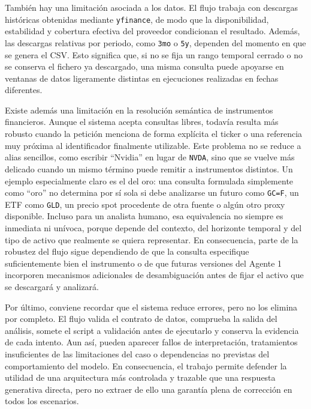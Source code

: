 Tambi\'en hay una limitaci\'on asociada a los datos. El flujo trabaja con descargas hist\'oricas obtenidas mediante \texttt{yfinance}, de modo que la disponibilidad, estabilidad
y cobertura efectiva del proveedor condicionan el resultado. Adem\'as, las descargas relativas por periodo, como \texttt{3mo} o \texttt{5y}, dependen del momento en que se
genera el CSV. Esto significa que, si no se fija un rango temporal cerrado o no se conserva el fichero ya descargado, una misma consulta puede apoyarse en ventanas de datos
ligeramente distintas en ejecuciones realizadas en fechas diferentes.

Existe adem\'as una limitaci\'on en la resoluci\'on sem\'antica de instrumentos financieros. Aunque el sistema acepta consultas libres, todav\'ia resulta m\'as robusto cuando la
petici\'on menciona de forma expl\'icita el ticker o una referencia muy pr\'oxima al identificador finalmente utilizable. Este problema no se reduce a alias sencillos, como
escribir ``Nvidia'' en lugar de \texttt{NVDA}, sino que se vuelve m\'as delicado cuando un mismo t\'ermino puede remitir a instrumentos distintos. Un ejemplo especialmente
claro es el del oro: una consulta formulada simplemente como ``oro'' no determina por s\'i sola si debe analizarse un futuro como \texttt{GC=F}, un ETF como \texttt{GLD},
un precio spot procedente de otra fuente o alg\'un otro proxy disponible. Incluso para un analista humano, esa equivalencia no siempre es inmediata ni un\'ivoca, porque depende
del contexto, del horizonte temporal y del tipo de activo que realmente se quiera representar. En consecuencia, parte de la robustez del flujo sigue dependiendo de que la
consulta especifique suficientemente bien el instrumento o de que futuras versiones del Agente 1 incorporen mecanismos adicionales de desambiguaci\'on antes de fijar el activo
que se descargar\'a y analizar\'a.


Por \'ultimo, conviene recordar que el sistema reduce errores, pero no los elimina por completo. El flujo valida el contrato de datos, comprueba la salida del an\'alisis,
somete el script a validaci\'on antes de ejecutarlo y conserva la evidencia de cada intento. Aun as\'i, pueden aparecer fallos de interpretaci\'on, tratamientos insuficientes
de las limitaciones del caso o dependencias no previstas del comportamiento del modelo. En consecuencia, el trabajo permite defender la utilidad de una arquitectura m\'as
controlada y trazable que una respuesta generativa directa, pero no extraer de ello una garant\'ia plena de correcci\'on en todos los escenarios.

